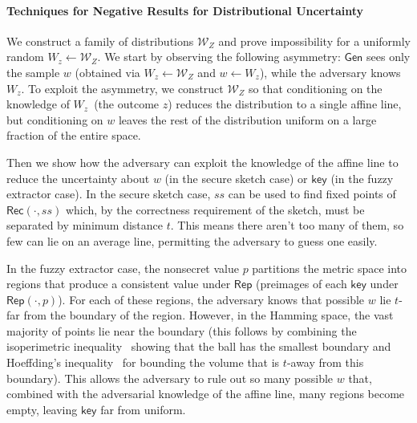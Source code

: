 \documentclass[11pt]{article}
\newcommand{\class}[1]{{\ensuremath{\mathsf{#1}}}}
\newcommand{\key}{\ensuremath{\class{key}}\xspace}
\newcommand{\gen}{\ensuremath{\class{Gen}}\xspace}
\newcommand{\rep}{\ensuremath{\class{Rep}}\xspace}
\newcommand{\rec}{\ensuremath{\class{Rec}}\xspace}
\begin{document}
\paragraph{Techniques for Negative Results for Distributional Uncertainty}
We construct a family of distributions $\mathcal{W}_Z$ and prove impossibility for a uniformly random $W_z \leftarrow \mathcal{W}_Z$.
We start by observing the following asymmetry: $\gen$  sees only the sample $w$ (obtained via $W_z\leftarrow \mathcal{W}_Z$ and $w\leftarrow W_z$), while
the adversary knows $W_z$.   To exploit the asymmetry, we construct $\mathcal{W}_Z$ so that conditioning on the knowledge of $W_z$~(the outcome $z$) reduces the distribution to a single affine line, but conditioning on $w$ leaves the rest of the distribution uniform on a large fraction of the entire space.

Then we show how the adversary can exploit the knowledge of the affine line to reduce the uncertainty about $w$ (in the secure sketch case) or $\key$ (in the fuzzy extractor case). 
In the secure sketch case, $ss$ can be used to find fixed points of $\rec(\cdot, ss)$ which, by the correctness requirement of the sketch, must be separated by minimum distance $t$. This means there aren't too many of them, so few can lie on an average line, permitting the adversary to guess one easily.

In the fuzzy extractor case, the nonsecret value $p$ partitions the metric space into regions that produce a consistent value under $\rep$ (preimages of each $\key$ under $\rep(\cdot, p)$).  For each of these regions, the adversary knows that possible $w$ lie $t$-far from the boundary of the region.  However, in the Hamming space, the vast majority of points lie near the boundary (this follows by combining the isoperimetric inequality~\cite{harper1966optimal} showing that the ball has the smallest boundary and Hoeffding's inequality~\cite{hoeffding1963probability} for bounding the volume that is $t$-away from this boundary).  This allows the adversary to rule out so many possible $w$ that, combined with the adversarial knowledge of the affine line, many regions become empty, leaving $\key$ far from uniform.
\end{document}
